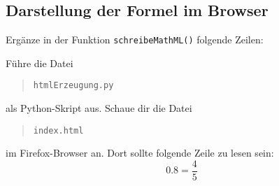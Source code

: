 \subsection*{Darstellung der Formel im Browser}

Ergänze in der Funktion \texttt{schreibeMathML()} folgende Zeilen:

\begin{codePython} 
\end{codePython}

Führe die Datei
\begin{quote}
	\texttt{htmlErzeugung.py}
\end{quote}
als Python-Skript aus. Schaue dir die Datei
\begin{quote}
	\texttt{index.html}
\end{quote} im Firefox-Browser an. Dort sollte folgende Zeile zu lesen sein:
\[
0.8 = \frac{4}{5}
\]

